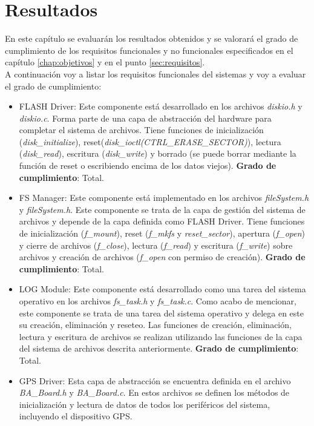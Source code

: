 \chapter{Resultados}
\label{chap:resultados}

En este capítulo se evaluarán los resultados obtenidos y se valorará el grado de cumplimiento de los requisitos funcionales y no funcionales especificados en el capítulo \ref{chap:objetivos} y en el punto \ref{sec:requisitos}.\\

A continuación voy a listar los requisitos funcionales del sistemas y voy a evaluar el grado de cumplimiento:
\begin{itemize}
\item FLASH Driver: Este componente está desarrollado en los archivos \textit{diskio.h} y \textit{diskio.c}. Forma parte de una capa de abstracción del hardware para completar el sistema de archivos. Tiene funciones de inicialización (\textit{disk\_initialize}), reset(\textit{disk\_ioctl(CTRL\_ERASE\_SECTOR)}), lectura (\textit{disk\_read}), escritura (\textit{disk\_write}) y borrado (se puede borrar mediante la función de reset o escribiendo encima de los datos viejos). \newline
\textbf{Grado de cumplimiento}: Total.
\item FS Manager: Este componente está implementado en los archivos \textit{fileSystem.h} y \textit{fileSystem.h}. Este componente se trata de la capa de gestión del sistema de archivos y depende de la capa definida como FLASH Driver. Tiene funciones de inicialización (\textit{f\_mount}), reset (\textit{f\_mkfs} y \textit{reset\_sector}), apertura (\textit{f\_open}) y cierre de archivos (\textit{f\_close}), lectura (\textit{f\_read}) y escritura (\textit{f\_write}) sobre archivos y creación de archivos (\textit{f\_open} con permiso de creación). \newline
\textbf{Grado de cumplimiento}: Total.
\item LOG Module: Este componente está desarrollado como una tarea del sistema operativo en los archivos \textit{fs\_task.h} y \textit{fs\_task.c}. Como acabo de mencionar, este componente se trata de una tarea del sistema operativo y delega en este su creación, eliminación y reseteo. Las funciones de creación, eliminación, lectura y escritura de archivos se realizan utilizando las funciones de la capa del sistema de archivos descrita anteriormente.\newline
\textbf{Grado de cumplimiento}: Total.
\item GPS Driver: Esta capa de abstracción se encuentra definida en el archivo \textit{BA\_Board.h} y \textit{BA\_Board.c}. En estos archivos se definen los métodos de inicialización y lectura de datos de todos los periféricos del sistema, incluyendo el dispositivo GPS.\newline

\end{itemize}
